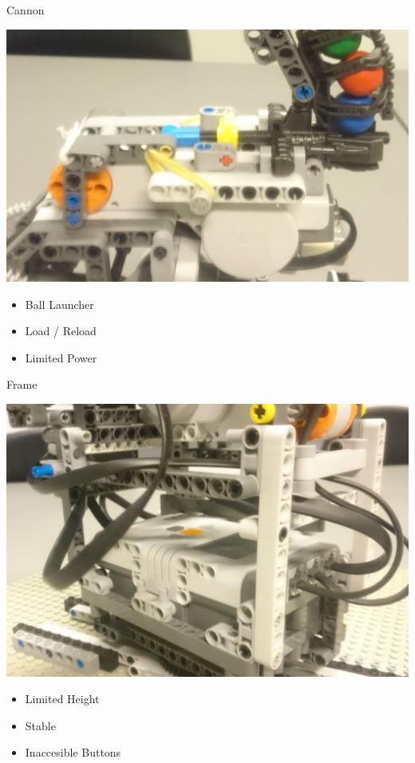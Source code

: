 \begin{frame}{Cannon}

\includegraphics[scale=0.15]{figures/CannonMech.JPG} 

\begin{itemize}
	\item Ball Launcher
	\item Load / Reload
	\item Limited Power
\end{itemize}
\end{frame}

\begin{frame}{Frame}

\includegraphics[scale=0.08]{figures/FrameMech.JPG} 

\begin{itemize}
	\item Limited Height
	\item Stable
	\item Inaccesible Buttons
\end{itemize}
\end{frame}

